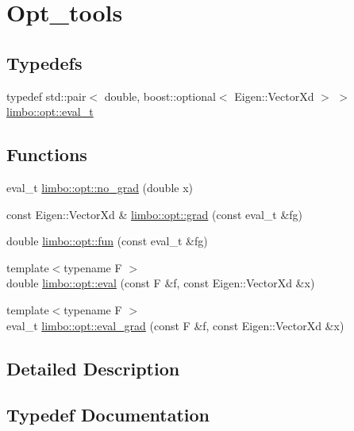 \hypertarget{group__opt__tools}{}\section{Opt\+\_\+tools}
\label{group__opt__tools}
\subsection*{Typedefs}
\begin{DoxyCompactItemize}
\item 
typedef std\+::pair$<$ double, boost\+::optional$<$ Eigen\+::\+Vector\+Xd $>$ $>$ \hyperlink{group__opt__tools_ga7fc87080ebf563d050fc547d25528ef0}{limbo\+::opt\+::eval\+\_\+t}
\end{DoxyCompactItemize}
\subsection*{Functions}
\begin{DoxyCompactItemize}
\item 
eval\+\_\+t \hyperlink{group__opt__tools_ga38e53ccac21f452bd31e9b239985d456}{limbo\+::opt\+::no\+\_\+grad} (double x)
\item 
const Eigen\+::\+Vector\+Xd \& \hyperlink{group__opt__tools_gaf28d9af930b2993024ab497b285e0521}{limbo\+::opt\+::grad} (const eval\+\_\+t \&fg)
\item 
double \hyperlink{group__opt__tools_ga68ad00d7501bc26a2a0990bac762393e}{limbo\+::opt\+::fun} (const eval\+\_\+t \&fg)
\item 
{\footnotesize template$<$typename F $>$ }\\double \hyperlink{group__opt__tools_ga698d932ac52cab812742b1300f875372}{limbo\+::opt\+::eval} (const F \&f, const Eigen\+::\+Vector\+Xd \&x)
\item 
{\footnotesize template$<$typename F $>$ }\\eval\+\_\+t \hyperlink{group__opt__tools_ga6abbcdf8d83abca89802881d883fb9e3}{limbo\+::opt\+::eval\+\_\+grad} (const F \&f, const Eigen\+::\+Vector\+Xd \&x)
\end{DoxyCompactItemize}


\subsection{Detailed Description}


\subsection{Typedef Documentation}
\hypertarget{group__opt__tools_ga7fc87080ebf563d050fc547d25528ef0}{}

